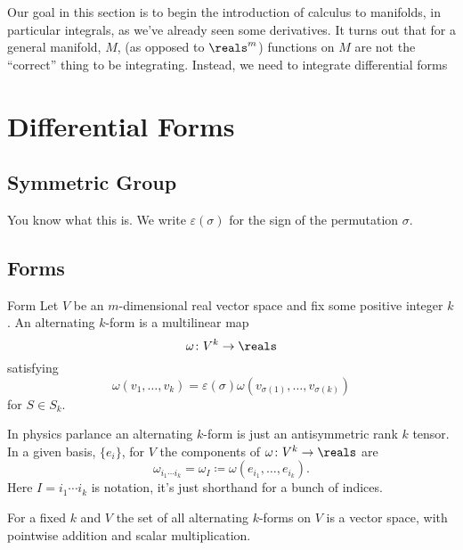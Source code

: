 \documentclass[fleqn]{NotesClass}
\begin{document}
    Our goal in this section is to begin the introduction of calculus to manifolds, in particular integrals, as we've already seen some derivatives.
    It turns out that for a general manifold, \(M\), (as opposed to \(\reals^m\)) functions on \(M\) are not the \enquote{correct} thing to be integrating.
    Instead, we need to integrate differential forms
    
    \section{Differential Forms}
    \subsection{Symmetric Group}
    You know what this is.
    We write \(\varepsilon(\sigma)\) for the sign of the permutation \(\sigma\).
    
    \subsection{Forms}
    \begin{dfn}{Form}{}
        Let \(V\) be an \(m\)-dimensional real vector space and fix some positive integer \(k\).
        An alternating \(k\)-form is a multilinear map
        \begin{equation}
            \omega \colon V^k \to \reals
        \end{equation}
        satisfying
        \begin{equation}
            \omega(v_1, \dotsc, v_k) = \varepsilon(\sigma) \omega(v_{\sigma(1)}, \dotsc, v_{\sigma(k)})
        \end{equation}
        for \(S \in S_k\).
    \end{dfn}
    
    In physics parlance an alternating \(k\)-form is just an antisymmetric rank \(k\) tensor.
    In a given basis, \(\{e_i\}\), for \(V\) the components of \(\omega \colon V^k \to \reals\) are
    \begin{equation}
        \omega_{i_1 \dotsm i_k} = \omega_I \coloneqq \omega(e_{i_1}, \dotsc, e_{i_k}).
    \end{equation}
    Here \(I = i_1\dotsm i_k\) is  notation, it's just shorthand for a bunch of indices.
    
    \begin{lma}{}{}
        For a fixed \(k\) and \(V\) the set of all alternating \(k\)-forms on \(V\) is a vector space, with pointwise addition and scalar multiplication.
    \end{lma}
    
\end{document}
